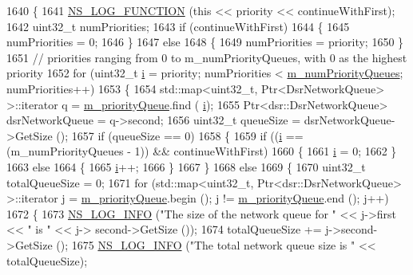 \begin{DoxyCode}
1640 \{
1641   \hyperlink{log-macros-disabled_8h_a90b90d5bad1f39cb1b64923ea94c0761}{NS\_LOG\_FUNCTION} (\textcolor{keyword}{this} << priority << continueWithFirst);
1642   uint32\_t numPriorities;
1643   \textcolor{keywordflow}{if} (continueWithFirst)
1644     \{
1645       numPriorities = 0;
1646     \}
1647   \textcolor{keywordflow}{else}
1648     \{
1649       numPriorities = priority;
1650     \}
1651   \textcolor{comment}{// priorities ranging from 0 to m\_numPriorityQueues, with 0 as the highest priority}
1652   \textcolor{keywordflow}{for} (uint32\_t \hyperlink{bernuolliDistribution_8m_a6f6ccfcf58b31cb6412107d9d5281426}{i} = priority; numPriorities < \hyperlink{classns3_1_1dsr_1_1DsrRouting_aa1952258d04f2ca8a0980d8436bca317}{m\_numPriorityQueues}; numPriorities++)
1653     \{
1654       std::map<uint32\_t, Ptr<DsrNetworkQueue> >::iterator q = \hyperlink{classns3_1_1dsr_1_1DsrRouting_a4606c3dfb1099afbfe1e7cd1d1c3c8ee}{m\_priorityQueue}.find (
      \hyperlink{bernuolliDistribution_8m_a6f6ccfcf58b31cb6412107d9d5281426}{i});
1655       Ptr<dsr::DsrNetworkQueue> dsrNetworkQueue = q->second;
1656       uint32\_t queueSize = dsrNetworkQueue->GetSize ();
1657       \textcolor{keywordflow}{if} (queueSize == 0)
1658         \{
1659           \textcolor{keywordflow}{if} ((\hyperlink{bernuolliDistribution_8m_a6f6ccfcf58b31cb6412107d9d5281426}{i} == (m\_numPriorityQueues - 1)) && continueWithFirst)
1660             \{
1661               \hyperlink{bernuolliDistribution_8m_a6f6ccfcf58b31cb6412107d9d5281426}{i} = 0;
1662             \}
1663           \textcolor{keywordflow}{else}
1664             \{
1665               \hyperlink{bernuolliDistribution_8m_a6f6ccfcf58b31cb6412107d9d5281426}{i}++;
1666             \}
1667         \}
1668       \textcolor{keywordflow}{else}
1669         \{
1670           uint32\_t totalQueueSize = 0;
1671           \textcolor{keywordflow}{for} (std::map<uint32\_t, Ptr<dsr::DsrNetworkQueue> >::iterator j = 
      \hyperlink{classns3_1_1dsr_1_1DsrRouting_a4606c3dfb1099afbfe1e7cd1d1c3c8ee}{m\_priorityQueue}.begin (); j != \hyperlink{classns3_1_1dsr_1_1DsrRouting_a4606c3dfb1099afbfe1e7cd1d1c3c8ee}{m\_priorityQueue}.end (); j++)
1672             \{
1673               \hyperlink{group__logging_gafbd73ee2cf9f26b319f49086d8e860fb}{NS\_LOG\_INFO} (\textcolor{stringliteral}{"The size of the network queue for "} << j->first << \textcolor{stringliteral}{" is "} << j->
      second->GetSize ());
1674               totalQueueSize += j->second->GetSize ();
1675               \hyperlink{group__logging_gafbd73ee2cf9f26b319f49086d8e860fb}{NS\_LOG\_INFO} (\textcolor{stringliteral}{"The total network queue size is "} << totalQueueSize);

\end{DoxyCode}
